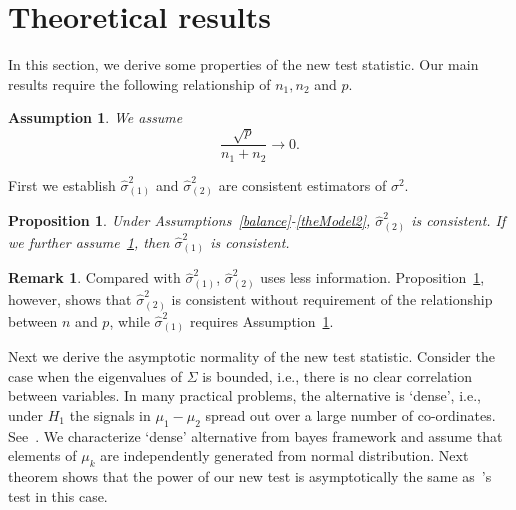 \documentclass[review]{elsarticle}
\theoremstyle{plain}
\newtheorem{proposition}{\quad\quad Proposition}
\newtheorem{assumption}{\quad\quad Assumption}
\theoremstyle{definition}
\newtheorem{remark}{\quad\quad Remark}
\theoremstyle{remark}
\begin{document}
\section{Theoretical results}

In this section, we derive some properties of the new test statistic. Our main results require the following relationship of $n_1,n_2$ and $p$.
\begin{assumption}\label{pAndN}
    We assume
    $$
    \frac{\sqrt{p}}{n_1+n_2}\to 0.
    $$
\end{assumption}


First we establish $\hat{\sigma}^2_{(1)}$ and $\hat{\sigma}^2_{(2)}$ are consistent estimators of $\sigma^2$. 
\begin{proposition}\label{varianceEstimation}
    Under Assumptions~\ref{balance}-\ref{theModel2}, %
     $\hat{\sigma}_{(2)}^2$ is consistent.
    If we further assume~\ref{pAndN}, then $\hat{\sigma}_{(1)}^2$ is consistent.
\end{proposition}

\begin{remark}
    Compared with $\hat{\sigma}^2_{(1)}$, $\hat{\sigma}^2_{(2)}$ uses less information. Proposition~\ref{varianceEstimation}, however, shows that $\hat{\sigma}^2_{(2)}$ is consistent without requirement of the relationship between $n$ and $p$, while $\hat{\sigma}^2_{(1)}$ requires Assumption~\ref{pAndN}.
\end{remark}

Next we derive the asymptotic normality of the new test statistic. Consider the case  when the eigenvalues of $\Sigma$ is bounded, i.e., there is no clear correlation between variables.
In many practical problems, the alternative is `dense', i.e., under $H_1$ the signals in $\mu_1-\mu_2$ spread out over a large number of co-ordinates. See~\cite{Tony2013}.
We characterize `dense' alternative from bayes framework and assume that elements of $\mu_k$  are independently generated from normal distribution.
Next theorem shows that  the power of our new test is asymptotically the same as~\cite{Chen2010A}'s test in this case.
\end{document}

